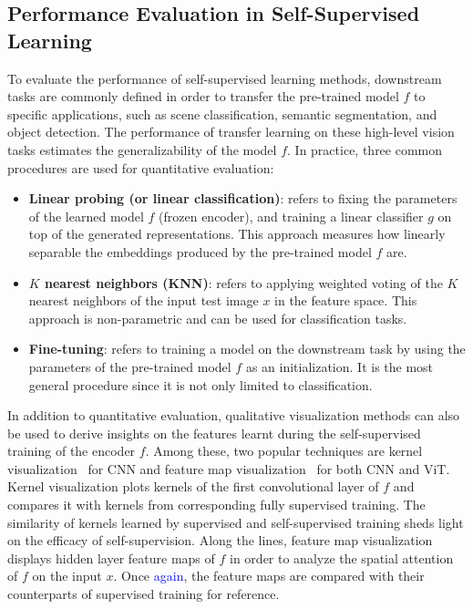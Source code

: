 \documentclass[lettersize,journal]{IEEEtran}
\begin{document}
\subsection{Performance Evaluation in Self-Supervised Learning}

To evaluate the performance of self-supervised learning methods, downstream tasks are commonly defined in order to transfer the pre-trained model $f$ to specific applications, such as scene classification, semantic segmentation, and object detection. The performance of transfer learning on these high-level vision tasks estimates the generalizability of the model $f$. In practice, three common procedures are used for quantitative evaluation: 
\begin{itemize}
    \item \textbf{Linear probing (or linear classification)}: refers to fixing the parameters of the learned model $f$ (frozen encoder), and training a linear classifier $g$ on top of the generated representations. This approach measures how linearly separable the embeddings produced by the pre-trained model $f$ are.
    \item \textbf{$K$ nearest neighbors (KNN)}: refers to applying weighted voting of the $K$ nearest neighbors of the input test image $x$ in the feature space. This approach is non-parametric and can be used for classification tasks. 
    \item \textbf{Fine-tuning}: refers to training a model on the downstream task by using the parameters of the pre-trained model $f$ as an initialization. It is the most general procedure since it is not only limited to classification.  
\end{itemize}

In addition to quantitative evaluation, qualitative visualization methods can also be used to derive insights on the features learnt during the self-supervised training of the encoder $f$. Among these, two popular techniques are kernel visualization~\cite{gidaris2018unsupervised,noroozi2018boosting,caron2018deep} for CNN and feature map visualization~\cite{gidaris2018unsupervised,caron2021emerging,el2021xcit} for both CNN and ViT. Kernel visualization plots kernels of the first convolutional layer of $f$ and compares it with kernels from corresponding fully supervised training. The similarity of kernels learned by supervised and self-supervised training sheds light on the efficacy of self-supervision. Along the lines, feature map visualization displays hidden layer feature maps of $f$ in order to analyze the spatial attention of $f$ on the input $x$. Once \textcolor{blue}{again}, the feature maps are compared with their counterparts of supervised training for reference. 
\end{document}
